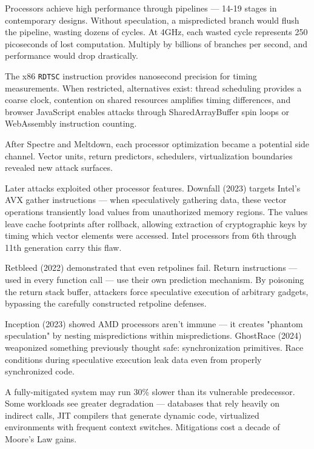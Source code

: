 Processors achieve high performance through pipelines — 14-19 stages in contemporary designs. Without speculation, a mispredicted branch would flush the pipeline, wasting dozens of cycles. At 4GHz, each wasted cycle represents 250 picoseconds of lost computation. Multiply by billions of branches per second, and performance would drop drastically.

The x86 \texttt{RDTSC} instruction provides nanosecond precision for timing measurements. When restricted, alternatives exist: thread scheduling provides a coarse clock, contention on shared resources amplifies timing differences, and browser JavaScript enables attacks through SharedArrayBuffer spin loops or WebAssembly instruction counting.

After Spectre and Meltdown, each processor optimization became a potential side channel. Vector units, return predictors, schedulers, virtualization boundaries revealed new attack surfaces.

Later attacks exploited other processor features. Downfall (2023) targets Intel's AVX gather instructions — when speculatively gathering data, these vector operations transiently load values from unauthorized memory regions. The values leave cache footprints after rollback, allowing extraction of cryptographic keys by timing which vector elements were accessed. Intel processors from 6th through 11th generation carry this flaw.

Retbleed (2022) demonstrated that even retpolines fail. Return instructions — used in every function call — use their own prediction mechanism. By poisoning the return stack buffer, attackers force speculative execution of arbitrary gadgets, bypassing the carefully constructed retpoline defenses.

Inception (2023) showed AMD processors aren't immune — it creates "phantom speculation" by nesting mispredictions within mispredictions. GhostRace (2024) weaponized something previously thought safe: synchronization primitives. Race conditions during speculative execution leak data even from properly synchronized code.

A fully-mitigated system may run 30\% slower than its vulnerable predecessor. Some workloads see greater degradation — databases that rely heavily on indirect calls, JIT compilers that generate dynamic code, virtualized environments with frequent context switches. Mitigations cost a decade of Moore's Law gains.

